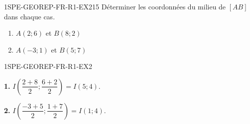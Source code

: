 \begin{exercice}{1SPE-GEOREP-FR-R1-EX2}{1}{5}
Déterminer les coordonnées du milieu de $[AB]$ dans chaque cas.
\begin{enumerate}
  \item $A(2 ; 6)$ et $B(8 ; 2)$
  \item $A(-3 ; 1)$ et $B(5 ; 7)$
\end{enumerate}
\end{exercice}


\begin{corrige}{1SPE-GEOREP-FR-R1-EX2}

\textbf{1.} $I\!\left(\dfrac{2+8}{2} ; \dfrac{6+2}{2}\right) = I(5 ; 4)$.

\textbf{2.} $I\!\left(\dfrac{-3+5}{2} ; \dfrac{1+7}{2}\right) = I(1 ; 4)$.

\end{corrige}
